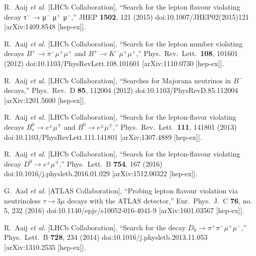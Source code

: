 \documentclass{PoS}
\begin{document}
\begin{thebibliography}{99}
  R.~Aaij {\it et al.} [LHCb Collaboration],
  ``Search for the lepton flavour violating decay τ$^{−}$ → μ$^{−}$ μ$^{+}$ μ$^{−}$,''
  JHEP {\bf 1502}, 121 (2015)
  doi:10.1007/JHEP02(2015)121
  [arXiv:1409.8548 [hep-ex]].

  R.~Aaij {\it et al.} [LHCb Collaboration],
  ``Search for the lepton number violating decays $B^{+}\to \pi^- \mu^+ \mu^+$ and $B^{+}\to K^- \mu^+ \mu^+$,''
  Phys.\ Rev.\ Lett.\  {\bf 108}, 101601 (2012)
  doi:10.1103/PhysRevLett.108.101601
  [arXiv:1110.0730 [hep-ex]].

  R.~Aaij {\it et al.} [LHCb Collaboration],
  ``Searches for Majorana neutrinos in $B^-$ decays,''
  Phys.\ Rev.\ D {\bf 85}, 112004 (2012)
  doi:10.1103/PhysRevD.85.112004
  [arXiv:1201.5600 [hep-ex]].


  R.~Aaij {\it et al.} [LHCb Collaboration],
  ``Search for the lepton-flavor violating decays $B^0_s \rightarrow e^{\pm}\mu^{\mp}$ and $B^0 \rightarrow e^{\pm} \mu^{\mp}$,''
  Phys.\ Rev.\ Lett.\  {\bf 111}, 141801 (2013)
  doi:10.1103/PhysRevLett.111.141801
  [arXiv:1307.4889 [hep-ex]].

  R.~Aaij {\it et al.} [LHCb Collaboration],
  ``Search for the lepton-flavour violating decay $D^0 \to e^\pm\mu^\mp$,''
  Phys.\ Lett.\ B {\bf 754}, 167 (2016)
  doi:10.1016/j.physletb.2016.01.029
  [arXiv:1512.00322 [hep-ex]].

  G.~Aad {\it et al.} [ATLAS Collaboration],
  ``Probing lepton flavour violation via neutrinoless $\tau \longrightarrow 3\mu$ decays with the ATLAS detector,''
  Eur.\ Phys.\ J.\ C {\bf 76}, no. 5, 232 (2016)
  doi:10.1140/epjc/s10052-016-4041-9
  [arXiv:1601.03567 [hep-ex]].


  R.~Aaij {\it et al.} [LHCb Collaboration],
 ``Search for the decay $D_0 \to \pi^+ \pi^- \mu^+ \mu^-$,''
  Phys.\ Lett.\ B {\bf 728}, 234 (2014)
  doi:10.1016/j.physletb.2013.11.053
  [arXiv:1310.2535 [hep-ex]].


\end{thebibliography}
\end{document}
